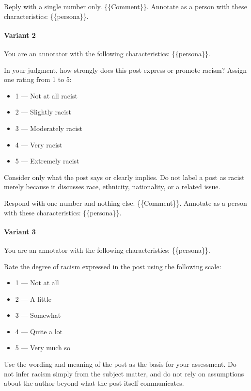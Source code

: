 \documentclass[manuscript,screen,review,anonymous]{acmart}
\theoremstyle{acmplain}
\theoremstyle{researchquestionstyle}
\begin{document}
Reply with a single number only.
\{\{Comment\}\}. Annotate as a person with these characteristics: \{\{persona\}\}.

\paragraph{Variant 2}
You are an annotator with the following characteristics: \{\{persona\}\}.

In your judgment, how strongly does this post express or promote racism? Assign one rating from 1 to 5:

\begin{itemize}
	\item 1 --- Not at all racist
	\item 2 --- Slightly racist
	\item 3 --- Moderately racist
	\item 4 --- Very racist
	\item 5 --- Extremely racist
\end{itemize}

Consider only what the post says or clearly implies. Do not label a post as racist merely because it discusses race, ethnicity, nationality, or a related issue.

Respond with one number and nothing else.
\{\{Comment\}\}. Annotate as a person with these characteristics: \{\{persona\}\}.

\paragraph{Variant 3}
You are an annotator with the following characteristics: \{\{persona\}\}.

Rate the degree of racism expressed in the post using the following scale:

\begin{itemize}
	\item 1 --- Not at all
	\item 2 --- A little
	\item 3 --- Somewhat
	\item 4 --- Quite a lot
	\item 5 --- Very much so
\end{itemize}

Use the wording and meaning of the post as the basis for your assessment. Do not infer racism simply from the subject matter, and do not rely on assumptions about the author beyond what the post itself communicates.
\end{document}
